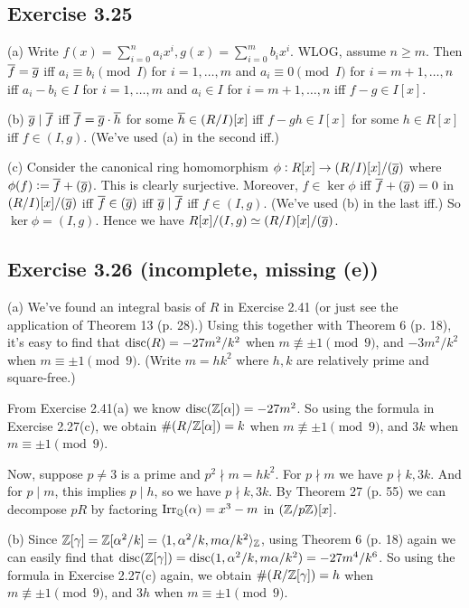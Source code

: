 \documentclass[../Marcus.tex]{subfiles}
\begin{document}
\subsection*{Exercise 3.25}

(a) Write $f(x)=\sum_{i=0}^n a_ix^i,g(x)=\sum_{i=0}^m b_ix^i$. WLOG, assume $n\geq m$. Then $\overline{f}=\overline{g}$ iff $a_i\equiv b_i\pmod{I}$ for $i=1,\ldots,m$ and $a_i\equiv 0\pmod{I}$ for $i=m+1,\ldots,n$ iff $a_i-b_i\in I$ for $i=1,\ldots,m$ and $a_i\in I$ for $i=m+1,\ldots,n$ iff $f-g\in I[x]$.

(b) $\overline{g}\mid\overline{f}$ iff $\overline{f}=\overline{g}\cdot\overline{h}$ for some $\overline{h}\in (R/I)[x]$ iff $f-gh\in I[x]$ for some $h\in R[x]$ iff $f\in(I,g)$. (We've used (a) in the second iff.)

(c) Consider the canonical ring homomorphism $\phi:R[x]\to(R/I)[x]/(\overline{g})$ where $\phi(f):=\overline{f}+(\overline{g})$. This is clearly surjective. Moreover, $f\in\ker\phi$ iff $\overline{f}+(\overline{g})=0$ in $(R/I)[x]/(\overline{g})$ iff $\overline{f}\in(\overline{g})$ iff $\overline{g}\mid\overline{f}$ iff $f\in(I,g)$. (We've used (b) in the last iff.) So $\ker\phi=(I,g)$. Hence we have $R[x]/(I,g)\simeq (R/I)[x]/(\overline{g})$.

\subsection*{Exercise 3.26 \color{red}(incomplete, missing (e))}

(a) We've found an integral basis of $R$ in Exercise 2.41 (or just see the application of Theorem 13 (p. 28).) Using this together with Theorem 6 (p. 18), it's easy to find that $\operatorname{disc}(R)=-27m^2/k^2$ when $m\not\equiv \pm1 \pmod{9}$, and
$-3m^2/k^2$ when $m\equiv \pm1 \pmod{9}$. (Write $m=hk^2$ where $h,k$ are relatively prime and square-free.)

From Exercise 2.41(a) we know $\operatorname{disc}(\mathbb{Z}[\alpha])=-27m^2$. So using the formula in Exercise 2.27(c), we obtain $\#(R/\mathbb{Z}[\alpha])=k$ when $m\not\equiv \pm1 \pmod{9}$, and $3k$ when $m\equiv \pm1 \pmod{9}$.

Now, suppose $p\neq 3$ is a prime and $p^2\nmid m=hk^2$. For $p\nmid m$ we have $p\nmid k,3k$. And for $p\mid m$, this implies $p\mid h$, so we have $p\nmid k,3k$. By Theorem 27 (p. 55) we can decompose $pR$ by factoring $\operatorname{Irr}_{\mathbb{Q}}(\alpha)=x^3-m$ in $(\mathbb{Z}/p\mathbb{Z})[x]$.

(b) Since $\mathbb{Z}[\gamma]=\mathbb{Z}[\alpha^2/k]=\langle1,\alpha^2/k,m\alpha/k^2\rangle_{\mathbb{Z}}$, using Theorem 6 (p. 18) again we can easily find that $\operatorname{disc}(\mathbb{Z}[\gamma])=\operatorname{disc}(1,\alpha^2/k,m\alpha/k^2)=-27m^4/k^6$. So using the formula in Exercise 2.27(c) again, we obtain $\#(R/\mathbb{Z}[\gamma])=h$ when $m\not\equiv \pm1 \pmod{9}$, and $3h$ when $m\equiv \pm1 \pmod{9}$.
\end{document}
